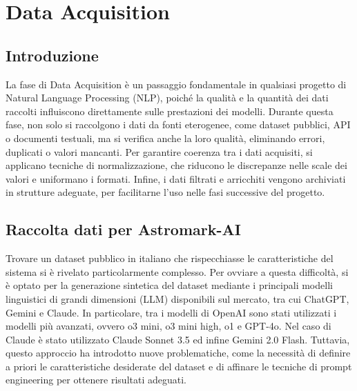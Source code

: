 \chapter{Data Acquisition}


\section{Introduzione}
La fase di Data Acquisition è un passaggio fondamentale in qualsiasi progetto di Natural Language Processing (NLP), poiché la qualità e la quantità dei dati raccolti influiscono direttamente sulle prestazioni dei modelli. Durante questa fase, non solo si raccolgono i dati da fonti eterogenee, come dataset pubblici, API o documenti testuali, ma si verifica anche la loro qualità, eliminando errori, duplicati o valori mancanti. Per garantire coerenza tra i dati acquisiti, si applicano tecniche di normalizzazione, che riducono le discrepanze nelle scale dei valori e uniformano i formati. Infine, i dati filtrati e arricchiti vengono archiviati in strutture adeguate, per facilitarne l’uso nelle fasi successive del progetto.

\section{Raccolta dati per Astromark-AI}
Trovare un dataset pubblico in italiano che rispecchiasse le caratteristiche del sistema si è rivelato particolarmente complesso. Per ovviare a questa difficoltà, si è optato per la generazione sintetica del dataset mediante i principali modelli linguistici di grandi dimensioni (LLM) disponibili sul mercato, tra cui ChatGPT, Gemini e Claude. In particolare, tra i modelli di OpenAI sono stati utilizzati i modelli più avanzati, ovvero o3 mini, o3 mini high, o1 e GPT-4o. Nel caso di Claude è stato utilizzato Claude Sonnet 3.5 ed infine Gemini 2.0 Flash. Tuttavia, questo approccio ha introdotto nuove problematiche, come la necessità di definire a priori le caratteristiche desiderate del dataset e di affinare le tecniche di prompt engineering per ottenere risultati adeguati.

